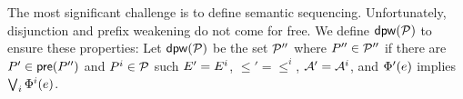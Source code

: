 The most significant challenge is to define semantic sequencing.
Unfortunately, disjunction and prefix weakening do not come for free.  We
define $\mathsf{dpw}(\mathcal{P})$ to ensure these properties: Let $\mathsf{dpw}(\mathcal{P})$
be the set $\mathcal{P}''$ where $P''\in\mathcal{P}''$ if there are
$P'\in\mathsf{pre}(P'')$ and $P^i\in\mathcal{P}$ such $E' = E^i$,
${\le'}={\le^i}$, $\mathcal{A}'=\mathcal{A}^i$, and $\Phi'(e)$
implies $\bigvee_i \Phi^i(e)$.




